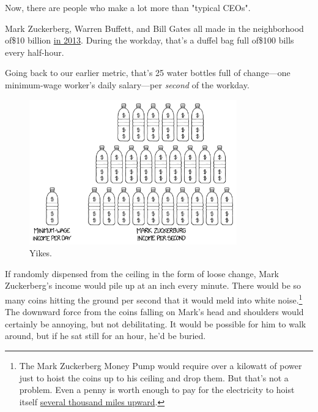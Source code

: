 {{Now, there are people who make a lot more than "typical CEOs".}

{Mark Zuckerberg, Warren Buffett, and Bill Gates all made in the neighborhood of\$10 billion \href{http://www.wealthx.com/articles/2013/revealed-billionaires-who-made-the-biggest-financial-gains-in-2013/}{in 2013}. During the workday, that's a duffel bag full of\$100 bills every half-hour.}

{Going back to our earlier metric, that's 25 water bottles full of change—one minimum-wage worker's daily salary—per \emph{second} of the workday.}

\begin{figure}[!htbp]
\centering
\includegraphics[scale=0.5, max width=0.8\textwidth]{imgs/a/118/comparison.png}
\caption{Yikes.}
\end{figure}

{If randomly dispensed from the ceiling in the form of loose change, Mark Zuckerberg's income would pile up at an inch every minute. There would be so many coins hitting the ground per second that it would meld into white noise.{\footnote{The Mark Zuckerberg Money Pump would require over a kilowatt of power just to hoist the coins up to his ceiling and drop them. But that's not a problem. Even a penny is worth enough to pay for the electricity to hoist itself \href{http://www.wolframalpha.com/input/?i=1+penny+\%2F+\%28cost+of+electricity\%29+\%2F+\%28penny+mass+*+earth+gravity\%29}{several thousand miles upward}.} } The downward force from the coins falling on Mark's head and shoulders would certainly be annoying, but not debilitating. It would be possible for him to walk around, but if he sat still for an hour, he'd be buried.}

}
